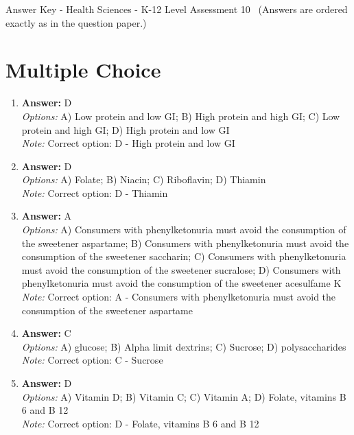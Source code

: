 \documentclass[12pt]{article}
\begin{document}
\begin{center}
Answer Key - Health Sciences - K-12 Level Assessment 10 \
\small (Answers are ordered exactly as in the question paper.)
\end{center}

\section*{Multiple Choice}
\begin{enumerate}[label=\arabic*.]
\item \textbf{Answer:} D
\\ \textit{Options:} A) Low protein and low GI; B) High protein and high GI; C) Low protein and high GI; D) High protein and low GI
\\ \textit{Note:} Correct option: D - High protein and low GI
\item \textbf{Answer:} D
\\ \textit{Options:} A) Folate; B) Niacin; C) Riboflavin; D) Thiamin
\\ \textit{Note:} Correct option: D - Thiamin
\item \textbf{Answer:} A
\\ \textit{Options:} A) Consumers with phenylketonuria must avoid the consumption of the sweetener aspartame; B) Consumers with phenylketonuria must avoid the consumption of the sweetener saccharin; C) Consumers with phenylketonuria must avoid the consumption of the sweetener sucralose; D) Consumers with phenylketonuria must avoid the consumption of the sweetener acesulfame K
\\ \textit{Note:} Correct option: A - Consumers with phenylketonuria must avoid the consumption of the sweetener aspartame
\item \textbf{Answer:} C
\\ \textit{Options:} A) glucose; B) Alpha limit dextrins; C) Sucrose; D) polysaccharides
\\ \textit{Note:} Correct option: C - Sucrose
\item \textbf{Answer:} D
\\ \textit{Options:} A) Vitamin D; B) Vitamin C; C) Vitamin A; D) Folate, vitamins B 6 and B 12
\\ \textit{Note:} Correct option: D - Folate, vitamins B 6 and B 12
\end{enumerate}
\end{document}
